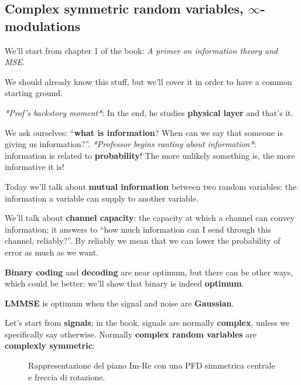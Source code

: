 \documentclass[a4paper, 12pt]{book}
\begin{document}
\subsection{Complex symmetric random variables, \texorpdfstring{$\infty$}{infinity}-modulations}
We'll start from chapter 1 of the book: \textit{A primer on information theory and MSE}.

We should already know this stuff, but we'll cover it in order to have a common starting ground.

\textit{*Prof's backstory moment*}: In the end, he studies \textbf{physical layer} and that's it.

We ask ourselves: ``\textbf{what is information}? When can we say that someone is giving us information?''.
\textit{*Professor begins ranting about information*}: information is related to \textbf{probability}! The more unlikely something is, the more informative it is!

Today we'll talk about \textbf{mutual information} between two random variables: the information a variable can supply to another variable.

We'll talk about \textbf{channel capacity}: the capacity at which a channel can convey information; it answers to ``how much information can I send through this channel, reliably?''. By reliably we mean that we can lower the probability of error as much as we want.

\textbf{Binary coding} and \textbf{decoding} are near optimum, but there can be other ways, which could be better: we'll show that binary is indeed \textbf{optimum}.

\textbf{LMMSE} is optimum when the signal and noise are \textbf{Gaussian}.

Let's start from \textbf{signals}; in the book, signals are normally \textbf{complex}, unless we specifically say otherwise.
Normally \textbf{complex random variables} are \textbf{complexly symmetric}:

\begin{figure}[h]
    \centering
    \caption{Rappresentazione del piano Im-Re con una PFD simmetrica centrale e freccia di rotazione.}
\end{figure}
\end{document}
